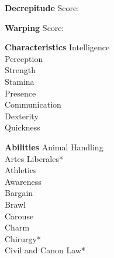 \documentclass[a4paper]{article}
\begin{document}
\begin{multicols}{2}
	\begin{minipage}{0.6\linewidth}
		\Large\textbf{Decrepitude}\hspace{0.1\linewidth} \normalsize{Score:}
	\end{minipage}
	\begin{minipage}{\linewidth}
		\Large\textbf{Warping}\hspace{0.3\linewidth} \normalsize{Score:}
	\end{minipage}
\end{multicols}
\begin{minipage}{0.4\linewidth}
	\Large\textbf{Characteristics}
	\normalsize\newline
	Intelligence \\
	Perception \\
	Strength \\
	Stamina \\
	Presence \\
	Communication \\
	Dexterity \\
	Quickness
\end{minipage}
\begin{minipage}{0.6\linewidth}
	\Large\textbf{Abilities}
	\normalsize\newline
	Animal Handling \\
	Artes Liberales* \\
	Athletics \\
	Awareness \\
	Bargain \\
	Brawl \\
	Carouse \\
	Charm \\
	Chirurgy* \\
	Civil and Canon Law* \\
	
\end{minipage}
\end{document}
